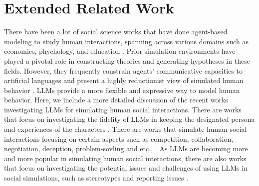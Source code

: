 \section{Extended Related Work}
\label{app:extended_related_work}
There have been a lot of social science works that have done agent-based modeling to study human interactions, spanning across various domains such as economics, phychology, and education \citep{Sawyer_2005, Rosé2008, DEGUCHI1995269}.
Prior simulation environments have played a pivotal role in constructing theories and generating hypotheses in these fields. 
However, they frequently constrain agents' communicative capacities to artificial languages and present a highly reductionist view of simulated human behavior \citep{Gilbert2005-cp, Tesfatsion2006-is, Huang2014-bk, kovač2021socialai, urbanek-etal-2019-learning}.
LLMs provide a more flexible and expressive way to model human behavior. Here, we include a more detailed discussion of the recent works investigating LLMs for simulating human social interactions.
There are works that focus on investigating the fidelity of LLMs in keeping the designated persona and experiences of the characters \citep{shao-etal-2023-character, Jiang2023PersonaLLMIT}.
There are works that simulate human social interactions focusing on certain aspects such as competition, collaboration, negotiation, deception, problem-sovling and etc., \citep{zhang2024exploring, zhao2023competeai, Liu2023ImprovingIC, michael2023debate, Rasal2024LLMHM, hubinger2024sleeper, bianchi2024llms, Xie2024CanLL, Jiang2023PersonaLLMIT}.
As LLMs are becoming more and more popular in simulating human social interactions, there are also works that focus on investigating the potential issues and challenges of using LLMs in social simulations, such as stereotypes and reporting issues \citep{cheng-etal-2023-compost, zhou2024real}.


